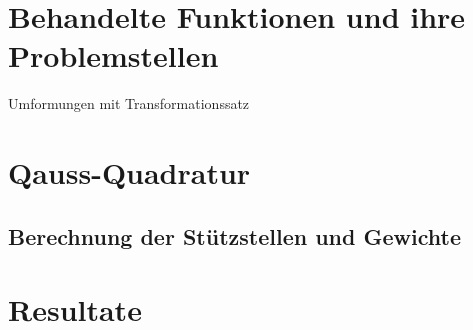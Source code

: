 \documentclass[12pt]{article}
\begin{document}
\newpage

\section{Behandelte Funktionen und ihre Problemstellen}
Umformungen mit Transformationssatz

\newpage

\section{Qauss-Quadratur}
\subsection{Berechnung der Stützstellen und Gewichte}

\newpage

\section{Resultate}

\newpage
\end{document}

